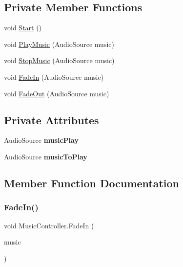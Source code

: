 \subsection*{Private Member Functions}
\begin{DoxyCompactItemize}
\item 
void \mbox{\hyperlink{class_music_controller_a262af298ee2c96b1f04d4f8a2ae58ef9}{Start}} ()
\item 
void \mbox{\hyperlink{class_music_controller_a7d34bde91299800af6deb844e6a3ce4b}{Play\+Music}} (Audio\+Source music)
\item 
void \mbox{\hyperlink{class_music_controller_ad34d18199b46d787b0fd54942602dbef}{Stop\+Music}} (Audio\+Source music)
\item 
void \mbox{\hyperlink{class_music_controller_a89fa8ad5c85a69e698e73c04f11f8542}{Fade\+In}} (Audio\+Source music)
\item 
void \mbox{\hyperlink{class_music_controller_a6f549e39e322a2b65adac53f7d931bc6}{Fade\+Out}} (Audio\+Source music)
\end{DoxyCompactItemize}
\subsection*{Private Attributes}
\begin{DoxyCompactItemize}
\item 
\mbox{\label{class_music_controller_a3e4ed4a92266c20ab487800c44dee9cb}} 
Audio\+Source {\bfseries music\+Play}
\item 
\mbox{\label{class_music_controller_ad2ff511dd4aeb345a6a91d771638162f}} 
Audio\+Source {\bfseries music\+To\+Play}
\end{DoxyCompactItemize}


\subsection{Member Function Documentation}
\mbox{\label{class_music_controller_a89fa8ad5c85a69e698e73c04f11f8542}} 
\subsubsection{\texorpdfstring{Fade\+In()}{FadeIn()}}
{\footnotesize\ttfamily void Music\+Controller.\+Fade\+In (\begin{DoxyParamCaption}\item[{Audio\+Source}]{music }\end{DoxyParamCaption})\hspace{0.3cm}{\ttfamily [private]}}


